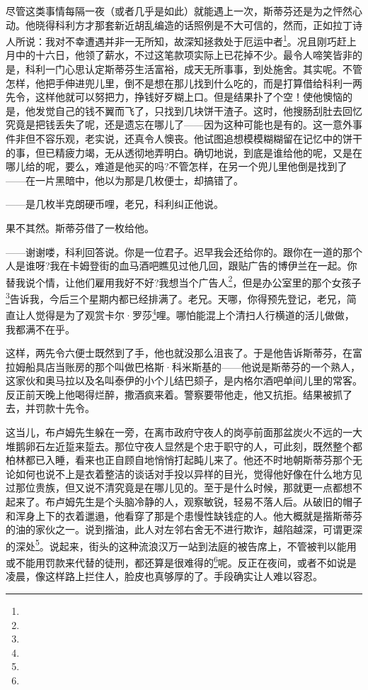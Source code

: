 \par 尽管这类事情每隔一夜（或者几乎是如此）就能遇上一次，斯蒂芬还是为之怦然心动。他晓得科利方才那套新近胡乱编造的话照例是不大可信的，然而，正如拉丁诗人所说：我对不幸遭遇并非一无所知，故深知拯救处于厄运中者\footnote{}。况且刚巧赶上月中的十六日，他领了薪水，不过这笔款项实际上已花掉不少。最令人啼笑皆非的是，科利一门心思认定斯蒂芬生活富裕，成天无所事事，到处施舍。其实呢。不管怎样，他把手伸进兜儿里，倒不是想在那儿找到什么吃的，而是打算借给科利一两先令，这样他就可以努把力，挣钱好歹糊上口。但是结果扑了个空！使他懊恼的是，他发觉自己的钱不翼而飞了，只找到几块饼干渣子。这时，他搜肠刮肚去回忆究竟是把钱丢失了呢，还是遗忘在哪儿了——因为这种可能也是有的。这一意外事件非但不容乐观，老实说，还真令人懊丧。他试图追想模模糊糊留在记忆中的饼干的事，但已精疲力竭，无从透彻地弄明白。确切地说，到底是谁给他的呢，又是在哪儿给的呢，要么，难道是他买的吗?不管怎样，在另一个兜儿里他倒是找到了——在一片黑暗中，他以为那是几枚便士，却搞错了。
\par ——是几枚半克朗硬币哩，老兄，科利纠正他说。
\par 果不其然。斯蒂芬借了一枚给他。
\par ——谢谢喽，科利回答说。你是一位君子。迟早我会还给你的。跟你在一道的那个人是谁呀?我在卡姆登街的血马酒吧瞧见过他几回，跟贴广告的博伊兰在一起。你替我说个情，让他们雇用我好不好?我想当个广告人\footnote{}，但是办公室里的那个女孩子\footnote{}告诉我，今后三个星期内都已经排满了。老兄。天哪，你得预先登记，老兄，简直让人觉得是为了观赏卡尔·罗莎\footnote{}哩。哪怕能混上个清扫人行横道的活儿做做，我都满不在乎。
\par 这样，两先令六便士既然到了手，他也就没那么沮丧了。于是他告诉斯蒂芬，在富拉姆船具店当账房的那个叫做巴格斯·科米斯基的——他说是斯蒂芬的一个熟人，这家伙和奥马拉以及名叫泰伊的小个儿结巴颏子，是内格尔酒吧单间儿里的常客。反正前天晚上他喝得烂醉，撒酒疯来着。警察要带他走，他又抗拒。结果被抓了去，并罚款十先令。
\par 这当儿，布卢姆先生躲在一旁，在离市政府守夜人的岗亭前面那盆炭火不远的一大堆鹅卵石左近踅来踅去。那位守夜人显然是个忠于职守的人，可此刻，既然整个都柏林都已入睡，看来也正自顾自地悄悄打起盹儿来了。他还不时地朝斯蒂芬那个无论如何也说不上是衣着整洁的谈话对手投以异样的目光，觉得他好像在什么地方见过那位贵族，但又说不清究竟是在哪儿见的。至于是什么时候，那就更一点都想不起来了。布卢姆先生是个头脑冷静的人，观察敏锐，轻易不落人后。从破旧的帽子和浑身上下的衣着邋遢，他看穿了那是个患慢性缺钱症的人。他大概就是揩斯蒂芬的油的家伙之一。说到揩油，此人对左邻右舍无不进行欺诈，越陷越深，可谓更深的深处\footnote{}。说起来，街头的这种流浪汉万一站到法庭的被告席上，不管被判以能用或不能用罚款来代替的徒刑，都还算是很难得的\footnote{}呢。反正在夜间，或者不如说是凌晨，像这样路上拦住人，脸皮也真够厚的了。手段确实让人难以容忍。
